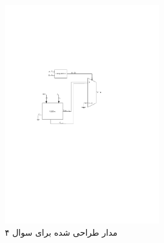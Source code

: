 \begin{figure}[h]
	\centering
	\includegraphics[width=0.6\textwidth]{fig/Q4.pdf}
	\caption{مدار طراحی شده برای سوال ۴}
	\label{Q4_Design}
\end{figure}